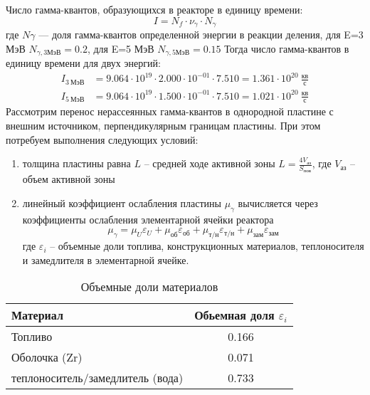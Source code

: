 \noindent Число гамма-квантов, образующихся в реакторе в единицу времени: 
\begin{equation}
        I = N_f \cdot \nu_\gamma \cdot N_\gamma
\end{equation}
\noindent где $N\gamma$ — доля гамма-квантов определенной энергии в реакции деления, для
E=3 МэВ $N_{\gamma, 3 \text{МэВ}}=0.2$, для E=5 МэВ $N_{\gamma, 5 \text{МэВ}} = 0.15$
Тогда число гамма-квантов в единицу времени для двух энергий:
\begin{align*}
        I_{3\ \text{МэВ}} &= 9.064 \cdot 10^{{ 19 }} \cdot 2.000 \cdot 10^{{ -01 }} \cdot 7.510  = 1.361 \cdot 10^{{ 20 }}\ \frac{\text{кв}}{\text{с}} \\
        I_{5\ \text{МэВ}} &= 9.064 \cdot 10^{{ 19 }} \cdot 1.500 \cdot 10^{{ -01 }} \cdot 7.510  = 1.021 \cdot 10^{{ 20 }}\ \frac{\text{кв}}{\text{с}}
\end{align*}
Рассмотрим перенос нерассеянных гамма-квантов в однородной пластине с внешним источником, перпендикулярным границам пластины. При этом потребуем выполнения следующих условий:
\begin{enumerate}
        \item  толщина пластины равна $L$ – средней ходе активной зоны $L = \frac{4 V_{\text{аз}}}{S_{\text{пов}}}$, где $V_{\text{аз}}$ – объем активной зоны
        \item линейный коэффициент ослабления пластины $\mu_\gamma$ вычисляется через коэффициенты ослабления элементарной ячейки реактора
        \begin{equation}
                \mu_\gamma = \mu_U\varepsilon_U + \mu_{\text{об}}\varepsilon_{\text{об}}+\mu_{\text{т/н}}\varepsilon_{\text{т/н}} + \mu_{\text{зам}}\varepsilon_{\text{зам}}
        \end{equation}
        где $\varepsilon_i$ – объемные доли топлива, конструкционных материалов, теплоносителя и замедлителя в элементарной ячейке.
\end{enumerate}

\begin{table}[H]
	\caption{Объемные доли материалов}
	\begin{center}
        \begin{tabular}{|l|c|}
        \toprule
         Материал & Обьемная доля $\varepsilon_i$ \\
         \midrule
         \hline
         Топливо & 0.166 \\
         \hline
         Оболочка (Zr) & 0.071 \\
         \hline
         теплоноситель/замедлитель (вода) & 0.733 \\
         \bottomrule
		\end{tabular}
		\label{tabular:objem_doli}
	\end{center}
\end{table}

